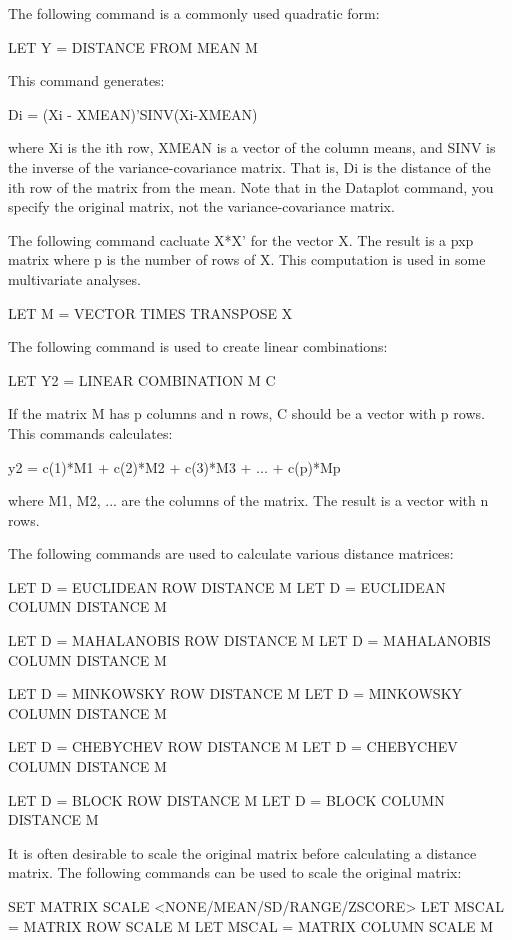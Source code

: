 {    The following command is a commonly used quadratic form:

        LET Y = DISTANCE FROM MEAN M

    This command generates:

         Di = (Xi - XMEAN)'SINV(Xi-XMEAN)

    where Xi is the ith row, XMEAN is a vector of the column
    means, and SINV is the inverse of the variance-covariance
    matrix.   That is, Di is the distance of the ith row of the
    matrix from the mean.  Note that in the Dataplot command, you
    specify the original matrix, not the variance-covariance matrix.

    The following command cacluate X*X' for the vector X.  The
    result is a pxp matrix where p is the number of rows of X.
    This computation is used in some multivariate analyses.

        LET M = VECTOR TIMES TRANSPOSE X

    The following command is used to create linear combinations:

        LET Y2 = LINEAR COMBINATION M C

    If the matrix M has p columns and n rows, C should be a vector
    with p rows.  This commands calculates:

        y2 = c(1)*M1 + c(2)*M2 + c(3)*M3 + ... + c(p)*Mp

    where M1, M2, ... are the columns of the matrix.  The result
    is a vector with n rows.

    The following commands are used to calculate various distance
    matrices:

        LET D = EUCLIDEAN ROW DISTANCE M
        LET D = EUCLIDEAN COLUMN DISTANCE M

        LET D = MAHALANOBIS ROW DISTANCE M
        LET D = MAHALANOBIS COLUMN DISTANCE M

        LET D = MINKOWSKY ROW DISTANCE M
        LET D = MINKOWSKY COLUMN DISTANCE M

        LET D = CHEBYCHEV ROW DISTANCE M
        LET D = CHEBYCHEV COLUMN DISTANCE M

        LET D = BLOCK ROW DISTANCE M
        LET D = BLOCK COLUMN DISTANCE M

    It is often desirable to scale the original matrix before
    calculating a distance matrix.  The following commands can
    be used to scale the original matrix:

         SET MATRIX SCALE <NONE/MEAN/SD/RANGE/ZSCORE>
         LET MSCAL = MATRIX ROW SCALE M
         LET MSCAL = MATRIX COLUMN SCALE M

}
